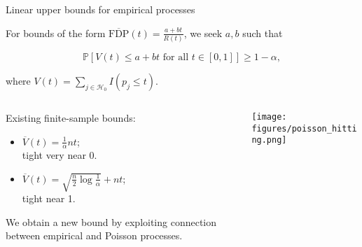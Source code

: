\documentclass{beamer}
\begin{document}
\begin{frame}{Linear upper bounds for empirical processes}

For bounds of the form $\displaystyle\overline{\text{FDP}}(t) = \frac{a+bt}{R(t)}$, we seek $a, b$ such that \vspace{-0.05in}

$$\displaystyle \mathbb P[V(t) \leq a + bt \text{ for all } t \in [0,1]] \geq 1-\alpha,$$

\vspace{-0.05in} where $V(t) = \sum_{j \in \mathcal H_0} I(p_j \leq t)$.

\pause

\vspace{0.1in}
\begin{columns}
	\begin{column}{0.5\textwidth}
		
		Existing finite-sample bounds:\footnotemark
		\begin{itemize}
			\item $\overline{V}(t) = \frac{1}{\alpha}nt$; \\ tight very near 0.
			\item $\overline{V}(t) = \sqrt{\frac n 2 \log \frac{1}{\alpha}} + nt$; \\ tight near 1.
		\end{itemize}
		\vspace{0.1in}
		
		We obtain a new bound by exploiting connection between empirical and Poisson processes.
	\end{column}
	\begin{column}{0.4\textwidth}
		\begin{center}
			\texttt{[image: figures/poisson\_hitting.png]}
		\end{center}
	\end{column}
\end{columns}


\end{frame}
%
\end{document}

